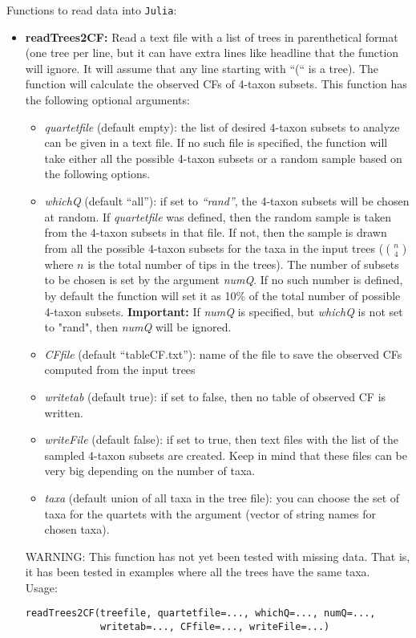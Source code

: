 \documentclass[12pt]{article}
\begin{document}
\noindent Functions to read data into \texttt{Julia}:
\begin{itemize}
\item \textbf{readTrees2CF:} Read a text file with a list of trees in
  parenthetical format (one tree per line, but it can have extra lines
  like headline that the function will ignore. It will assume that any
  line starting with ``(`` is a tree). The function will calculate the
  observed CFs of 4-taxon subsets.  This function has the following
  optional arguments:
\begin{itemize}
\item{\textit{quartetfile} (default empty): the list of desired
    4-taxon subsets to analyze can be given in a text file. If no
    such file is specified, the function will take either all the
    possible 4-taxon subsets or a random sample based on the following
    options.}
\item{\textit{whichQ} (default ``all''): if set to \textit{``rand''},
    the 4-taxon subsets will be chosen at random. If
    \textit{quartetfile} was defined, then the random sample is taken
    from the 4-taxon subsets in that file. If not, then the sample is
    drawn from all the possible 4-taxon subsets for the taxa in the
    input trees ($n \choose 4$ where $n$ is the total number of tips
    in the trees). The number of subsets to be chosen is set by the
    argument \textit{numQ}. If no such number is defined, by default
    the function will set it as 10\% of the total number of possible
    4-taxon subsets. \textbf{Important:} If \textit{numQ} is
    specified, but \textit{whichQ} is not set to "rand", then
    \textit{numQ} will be ignored.}
\item{\textit{CFfile} (default ``tableCF.txt''): name of the file to
    save the observed CFs computed from the input trees}
\item{\textit{writetab} (default true): if set to false, then no table
  of observed CF is written.}
\item{\textit{writeFile} (default false): if set to true, then text
    files with the list of the sampled 4-taxon subsets are
    created. Keep in mind that these files can be very big depending
    on the number of taxa.}
\item{\textit{taxa} (default union of all taxa in the tree file): you
    can choose the set of taxa for the quartets with the argument
    (vector of string names for chosen taxa).}
\end{itemize}

WARNING: This function has not yet been tested with missing data. That
is, it has been tested in
examples where all the trees have the same taxa.\\
Usage:
\begin{lstlisting}
readTrees2CF(treefile, quartetfile=..., whichQ=..., numQ=...,
             writetab=..., CFfile=..., writeFile=...)
\end{lstlisting}


\end{itemize}
\end{document}
